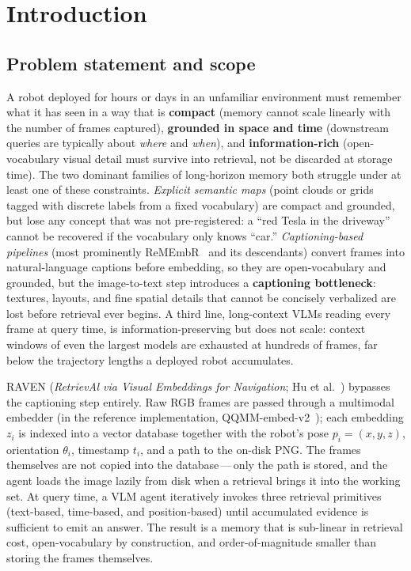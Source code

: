 \documentclass[12pt,letterpaper,oneside]{article}
\begin{document}
\setcounter{page}{5}
\tableofcontents
\newpage

\section{Introduction}\label{sec:intro}

\subsection{Problem statement and scope}

A robot deployed for hours or days in an unfamiliar environment must
remember what it has seen in a way that is \textbf{compact} (memory
cannot scale linearly with the number of frames captured),
\textbf{grounded in space and time} (downstream queries are typically
about \emph{where} and \emph{when}), and \textbf{information-rich}
(open-vocabulary visual detail must survive into retrieval, not be
discarded at storage time).  The two dominant families of long-horizon
memory both struggle under at least one of these constraints.
\emph{Explicit semantic maps} (point clouds or grids tagged with
discrete labels from a fixed vocabulary) are compact and grounded,
but lose any concept that was not pre-registered: a ``red Tesla in the
driveway'' cannot be recovered if the vocabulary only knows ``car.''
\emph{Captioning-based pipelines} (most prominently
ReMEmbR~\cite{ref:remembr} and its descendants) convert frames into
natural-language captions before embedding, so they are
open-vocabulary and grounded, but the image-to-text step introduces a
\textbf{captioning bottleneck}: textures, layouts, and fine spatial
details that cannot be concisely verbalized are lost before retrieval
ever begins.  A third line, long-context VLMs reading every frame at
query time, is information-preserving but does not scale: context
windows of even the largest models are exhausted at hundreds of frames,
far below the trajectory lengths a deployed robot accumulates.

RAVEN (\emph{RetrievAl via Visual Embeddings for Navigation};
Hu et al.~\cite{ref:raven}) bypasses the captioning step entirely.
Raw RGB frames are passed through a multimodal embedder (in the
reference implementation, QQMM-embed-v2~\cite{ref:qqmm}); each
embedding $z_i$ is indexed into a vector database together with the
robot's pose $p_i = (x, y, z)$, orientation $\theta_i$, timestamp
$t_i$, and a path to the on-disk PNG.  The frames themselves are not
copied into the database\,---\,only the path is stored, and the
agent loads the image lazily from disk when a retrieval brings it
into the working set.  At query time, a VLM agent iteratively invokes three
retrieval primitives (text-based, time-based, and position-based)
until accumulated evidence is sufficient to emit an answer.  The result is a memory that is sub-linear in retrieval cost,
open-vocabulary by construction, and order-of-magnitude smaller than
storing the frames themselves.
\end{document}
